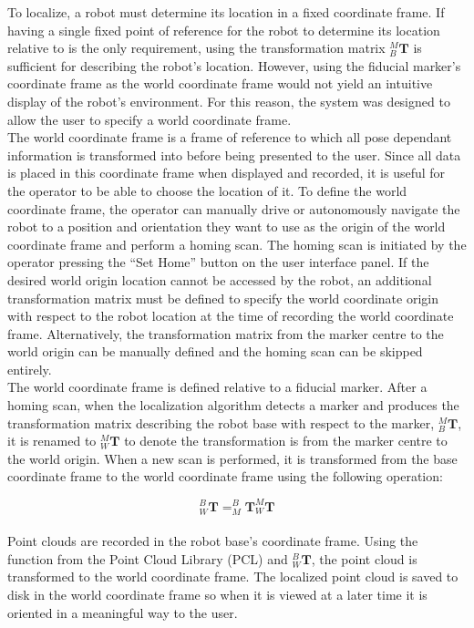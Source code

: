 To localize, a robot must determine its location in a fixed coordinate frame. If having a single fixed point of reference for the robot to determine its location relative to is the only requirement, using the transformation matrix $^{M}_{B}\mathbf{T}$ is sufficient for describing the robot's location. However, using the fiducial marker's coordinate frame as the world coordinate frame would not yield an intuitive display of the robot's environment. For this reason, the system was designed to allow the user to specify a world coordinate frame.\\

The world coordinate frame is a frame of reference to which all pose dependant information is transformed into before being presented to the user. Since all data is placed in this coordinate frame when displayed and recorded, it is useful for the operator to be able to choose the location of it. To define the world coordinate frame, the operator can manually drive or autonomously navigate the robot to a position and orientation they want to use as the origin of the world coordinate frame and perform a homing scan. The homing scan is initiated by the operator pressing the ``Set Home'' button on the user interface panel. If the desired world origin location cannot be accessed by the robot, an additional transformation matrix must be defined to specify the world coordinate origin with respect to the robot location at the time of recording the world coordinate frame. Alternatively, the transformation matrix from the marker centre to the world origin can be manually defined and the homing scan can be skipped entirely.\\

The world coordinate frame is defined relative to a fiducial marker. After a homing scan, when the localization algorithm detects a marker and produces the transformation matrix describing the robot base with respect to the marker, $^{M}_{B}\mathbf{T}$, it is renamed to $^{M}_{W}\mathbf{T}$ to denote the transformation is from the marker centre to the world origin. When a new scan is performed, it is transformed from the base coordinate frame to the world coordinate frame using the following operation:

\begin{equation}
    ^{B}_{W}\mathbf{T} = ^{B}_{M}\mathbf{T}^{M}_{W}\mathbf{T}
\end{equation}\\

Point clouds are recorded in the robot base's coordinate frame. Using the function  from the Point Cloud Library (PCL) and $^{B}_{W}\mathbf{T}$, the point cloud is transformed to the world coordinate frame. The localized point cloud is saved to disk in the world coordinate frame so when it is viewed at a later time it is oriented in a meaningful way to the user.\\

